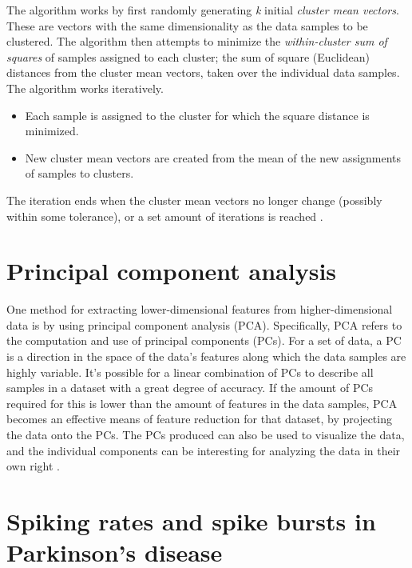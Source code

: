 \documentclass{kththesis}
\begin{document}
The algorithm works by first randomly generating \textit{k} initial \textit{cluster mean vectors}. 
These are vectors with the same dimensionality as the data samples to be clustered. 
The algorithm then attempts to minimize the \textit{within-cluster sum of squares} of samples assigned to each cluster; the sum of square (Euclidean) distances from the cluster mean vectors, taken over the individual data samples.
The algorithm works iteratively. 
\begin{itemize}
    \item Each sample is assigned to the cluster for which the square distance is minimized.
    \item New cluster mean vectors are created from the mean of the new assignments of samples to clusters.
\end{itemize}
The iteration ends when the cluster mean vectors no longer change (possibly within some tolerance), or a set amount of iterations is reached \parencite[p258-260]{PractStats}.

\section{Principal component analysis}\label{PCA BG}

One method for extracting lower-dimensional features from higher-dimensional data is by using principal component analysis (PCA).
Specifically, PCA refers to the computation and use of principal components (PCs).
For a set of data, a PC is a direction in the space of the data's features along which the data samples are highly variable.
It's possible for a linear combination of PCs to describe all samples in a dataset with a great degree of accuracy.
If the amount of PCs required for this is lower than the amount of features in the data samples, PCA becomes an effective means of feature reduction for that dataset, by projecting the data onto the PCs.
The PCs produced can also be used to visualize the data, and the individual components can be interesting for analyzing the data in their own right \parencite[p374-380]{ISLR}.

\section{Spiking rates and spike bursts in Parkinson's disease}\label{BG SpikeRates}
\end{document}
